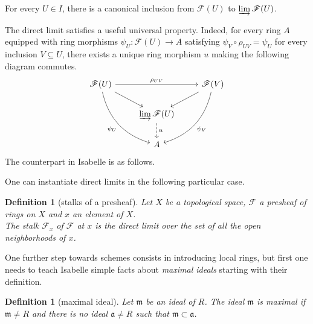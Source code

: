 \documentclass[12pt]{scrartcl}
\newtheorem{definition}[proposition]{Definition}
\begin{document}
For every $U \in I$, there is a canonical inclusion from $\mathscr{F}(U)$ to $\varinjlim \mathscr{F}(U)$. 


The direct limit satisfies a useful universal property. Indeed, for every ring $A$ equipped with ring morphisms $\psi_U: \mathscr{F}(U) \rightarrow A$ satisfying $\psi_V \circ \rho_{UV} = \psi_U$ for every inclusion $V \subseteq U$, there exists a unique ring morphism $u$ making the following diagram commutes.
\[
\begin{tikzcd}
\mathscr{F}(U)  \arrow[rr, "\rho_{UV}"] \arrow[rd] \arrow[rdd, bend right, "\psi_U"'] & & \mathscr{F}(V) \arrow[ld]	\arrow[ldd, bend left, "\psi_V"]	\\
						& \varinjlim \mathscr{F}(U) \arrow[d, "u", dashed] &	\\
						& A &  
\end{tikzcd}
\] 
The counterpart in Isabelle is as follows.


One can instantiate direct limits in the following particular case.

\begin{definition}[stalks of a presheaf]
	Let $X$ be a topological space, $\mathscr{F}$ a presheaf of rings on $X$ and $x$ an element of $X$. \\
	The stalk $\mathscr{F}_x$ of $\mathscr{F}$ at $x$ is the direct limit over the set of all the open neighborhoods of $x$.   
\end{definition}


One further step towards schemes consists in introducing local rings, but first one needs to teach Isabelle simple facts about \emph{maximal ideals} starting with their definition. 

\begin{definition}[maximal ideal]
	Let $\mathfrak{m}$ be an ideal of $R$. The ideal $\mathfrak{m}$ is maximal if $\mathfrak{m} \neq R$ and there is no ideal $\mathfrak{a} \neq R$ such that $\mathfrak{m} \subset \mathfrak{a}$.
\end{definition}

\end{document}
